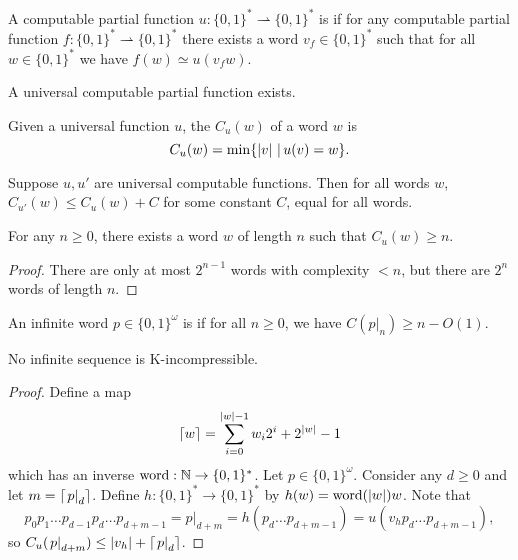 
A computable partial function $u: \{0,1\}^* \rightharpoonup \{0,1\}^*$ is
 if for any computable partial function $f: \{0,1\}^*
\rightharpoonup \{0,1\}^*$ there exists a word $v_f \in \{0,1\}^*$ such that for
all $w \in \{0,1\}^*$ we have $f(w) \simeq u(v_f w)$.

\begin{proposition}
  A universal computable partial function exists.
\end{proposition}

Given a universal function $u$, the  $C_u(w)$ of a
word $w$ is
\[
  C_u(w) = \min \{ \left| v \right| \,|\, u(v) = w \}.
\]

\begin{proposition}
  Suppose $u,u'$ are universal computable functions.
  Then for all words $w$, $C_{u'}(w) \le C_u(w) + C$ for some constant $C$,
  equal for all words.
\end{proposition}

\begin{proposition}
  For any $n \ge 0$, there exists a word $w$ of length $n$ such that $C_u(w) \ge
  n$.
\end{proposition}

\begin{proof}
  There are only at most $2^{n-1}$ words with complexity $< n$, but there are
  $2^n$ words of length $n$.
\end{proof}

\begin{definition}
  An infinite word $p \in \{0,1\}^\omega$ is  if for all
  $n \ge 0$, we have $C(\left. p \right|_n) \ge n - O(1)$.
\end{definition}

\begin{theorem}
  No infinite sequence is K-incompressible.
\end{theorem}

\begin{proof}
  Define a map
  \[
	\lceil w \rceil = \sum_{i=0}^{\left| w \right|-1} w_i 2^i + 2^{\left| w \right|} - 1
  \]
  which has an inverse $\operatorname{word}: \mathbb{N} \to \{0,1\}^*$.
  Let $p \in \{0,1\}^\omega$.
  Consider any $d \ge 0$ and let $m = \lceil \left. p\right|_d \rceil$.
  Define $h: \{0,1\}^* \to \{0,1\}^*$ by $h(w) = \operatorname{word}(\left| w \right|)
  w$.
  Note that
  \[
	p_0 p_1 \ldots p_{d-1} p_d \ldots p_{d+m-1} = \left. p \right|_{d+m}
	= h(p_d \ldots p_{d+m-1}) = u(v_h p_d \ldots p_{d+m-1}),
  \]
  so $C_u(\left. p \right|_{d+m}) \le \left| v_h \right| + \lceil \left. p \right|_d \rceil$.
\end{proof}

